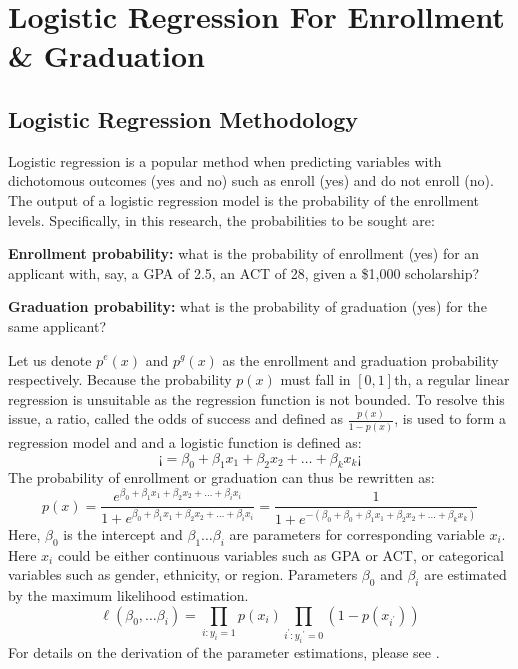 \documentclass[12pt,english]{report}
\begin{document}
\newpage
\section{Logistic Regression For Enrollment \& Graduation}
\subsection{Logistic Regression Methodology}

Logistic regression is a popular method when predicting variables with dichotomous outcomes (yes and no) such as enroll (yes) and do not enroll (no). The output of a logistic regression model is the probability of the enrollment levels. Specifically, in this research, the probabilities to be sought are:

\noindent \textbf{Enrollment probability:} what is the probability of enrollment (yes) for an applicant with, say, a GPA of 2.5, an ACT of 28, given a \$1,000 scholarship?

\noindent \textbf{Graduation probability:} what is the probability of graduation (yes) for the same applicant?

\vspace{0.15in}
Let us denote $p^e(x)$ and $p^g(x)$ as the enrollment and graduation probability respectively. Because the probability $p(x)$ must fall in $[0,1]$th, a regular linear regression is unsuitable as the regression function is not bounded. To resolve this issue, a ratio, called the odds of success and defined as  $\frac{p(x)}{1-p(x)}$,  is used to form a regression model and and a logistic function is defined as:
\begin{equation}
\ensuremath{¡=\beta_0+\beta_1 x_1+\beta_2 x_2 +\ldots+\beta_k x_k}
¡\end{equation}
The probability of enrollment or graduation can thus be rewritten as:
\begin{equation}
p(x)=\frac{e^{\beta_0+\beta_1 x_1+\beta_2 x_2 +\ldots+\beta_i x_i}}{1+e^{\beta_0+\beta_1 x_1+\beta_2 x_2 +\ldots+\beta_ix_i}}
=\frac{1}{1+e^{-(\beta_0+\beta_0+\beta_1 x_1+\beta_2 x_2 +\ldots+\beta_k x_k)}}
\end{equation}
Here, $\beta_0$ is the intercept and $\beta_1 \ldots \beta_i$ are parameters for corresponding variable $x_i$.  Here $x_i$ could be either continuous
variables such as GPA or  ACT, or categorical variables such as gender, ethnicity, or region.  Parameters $\beta_0$ and $\beta_i$ are estimated by the maximum likelihood estimation.
\begin{equation}
\ell(\beta_0,\ldots \beta_i) = \prod_{i:y_i=1} p(x_i)
\prod_{i^{'}:y_i{^{'}=0}} (1-p(x_{i^{'}}))
\end{equation}
For details on the derivation of the parameter estimations, please see \citet{Hosmer2013}.
\end{document}
